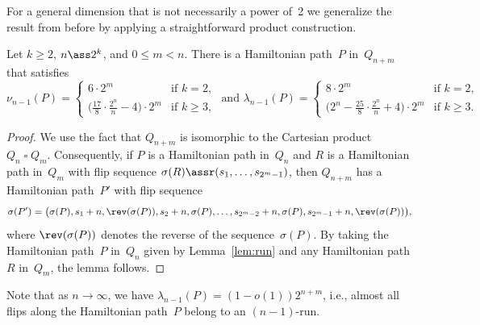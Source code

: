 %
For a general dimension that is not necessarily a power of~2 we generalize the result from before by applying a straightforward product construction.
%
\begin{corollary}
\label{cor:run}
Let $k\geq 2$, $n\ass 2^k$, and $0\le m <n$.
There is a Hamiltonian path~$P$ in~$Q_{n+m}$ that satisfies
\[ \nu_{n-1}(P)=\begin{cases}
               6\cdot 2^m & \text{if } k=2, \\
               \big(\frac{17}{8}\cdot\frac{2^n}{n}-4\big)\cdot 2^m & \text{if } k\ge 3,
               \end{cases} \text{   and   }
\lambda_{n-1}(P)=\begin{cases}
                 8\cdot 2^m & \text{if } k=2, \\
                 \big(2^n-\frac{25}{8}\cdot\frac{2^n}{n}+4\big)\cdot 2^m & \text{if } k\ge 3.
                 \end{cases} \]
\end{corollary}
%
\begin{proof}
We use the fact that $Q_{n+m}$ is isomorphic to the Cartesian product $Q_n \mathbin{\square} Q_m$.
Consequently, if $P$ is a Hamiltonian path in~$Q_n$ and $R$ is a Hamiltonian path in~$Q_m$ with flip sequence $\sigma(R)\assr(s_1,\dots,s_{2^m-1})$, then $Q_{n+m}$ has a Hamiltonian path~$P'$ with flip sequence
\[ \sigma(P')=\big(\sigma(P),s_1+n,\rev(\sigma(P)),s_2+n,\sigma(P),\ldots,s_{2^m-2}+n,\sigma(P),s_{2^m-1}+n,\rev(\sigma(P))\big), \]
where $\rev(\sigma(P))$ denotes the reverse of the sequence~$\sigma(P)$.
By taking the Hamiltonian path~$P$ in~$Q_n$ given by Lemma~\ref{lem:run} and any Hamiltonian path $R$ in~$Q_m$, the lemma follows.
\end{proof}
%
Note that as $n\rightarrow \infty$, we have $\lambda_{n-1}(P)=(1-o(1))2^{n+m}$, i.e., almost all flips along the Hamiltonian path~$P$ belong to an $(n-1)$-run.
%
%
